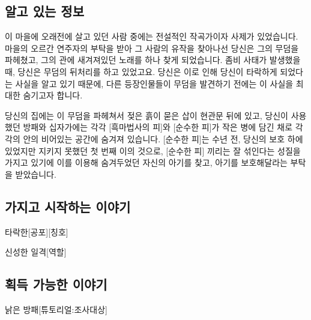\documentclass{report}
\begin{document}
	\subsection*{알고 있는 정보}
		이 마을에 오래전에 살고 있던 사람 중에는 전설적인 작곡가이자 사제가 있었습니다. 마을의 오르간 연주자의 부탁을 받아 그 사람의 유작을 찾아나선 당신은 그의 무덤을 파헤쳤고, 그의 관에 새겨져있던 노래를 하나 찾게 되었습니다. 좀비 사태가 발생했을 때, 당신은 무덤의 뒤처리를 하고 있었고요. 당신은 이로 인해 당신이 타락하게 되었다는 사실을 알고 있기 때문에, 다른 등장인물들이 무덤을 발견하기 전에는 이 사실을 최대한 숨기고자 합니다.
		
		당신의 집에는 이 무덤을 파헤쳐서 젖은 흙이 묻은 삽이 현관문 뒤에 있고, 당신이 사용했던 방패와 십자가에는 각각 [흑마법사의 피]와 [순수한 피]가 작은 병에 담긴 채로 각각의 안의 비어있는 공간에 숨겨져 있습니다. [순수한 피]는 수년 전, 당신의 보호 하에 있었지만 지키지 못했던 첫 번째 이의 것으로, [순수한 피] 끼리는 잘 섞인다는 성질을 가지고 있기에 이를 이용해 숨겨두었던 자신의 아기를 찾고, 아기를 보호해달라는 부탁을 받았습니다.
	
	\subsection*{가지고 시작하는 이야기}
		\begin{story}{타락한}{[공포][칭호]}
			
		\end{story}
		
		\begin{story}{신성한 일격}{[역할]}
		\end{story}
	
	\subsection*{획득 가능한 이야기}
		\begin{story}{낡은 방패}{[튜토리얼:조사대상]}
		\end{story}
		
\end{document}
